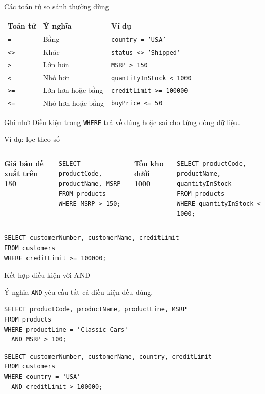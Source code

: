 \documentclass[aspectratio=169,11pt]{beamer}
\newcommand{\kw}[1]{\textcolor{sqlblue}{\texttt{#1}}}
\newcommand{\minihead}[1]{\vspace{2pt}\textbf{#1}\vspace{2pt}}
\begin{document}
\begin{frame}{Các toán tử so sánh thường dùng}
\begin{center}
\begin{tabular}{lll}
\toprule
\textbf{Toán tử} & \textbf{Ý nghĩa} & \textbf{Ví dụ} \\
\midrule
\texttt{=} & Bằng & \texttt{country = 'USA'} \\
\texttt{<>} & Khác & \texttt{status <> 'Shipped'} \\
\texttt{>} & Lớn hơn & \texttt{MSRP > 150} \\
\texttt{<} & Nhỏ hơn & \texttt{quantityInStock < 1000} \\
\texttt{>=} & Lớn hơn hoặc bằng & \texttt{creditLimit >= 100000} \\
\texttt{<=} & Nhỏ hơn hoặc bằng & \texttt{buyPrice <= 50} \\
\bottomrule
\end{tabular}
\end{center}
\begin{exampleblock}{Ghi nhớ}
Điều kiện trong \kw{WHERE} trả về đúng hoặc sai cho từng dòng dữ liệu.
\end{exampleblock}
\end{frame}

\begin{frame}[fragile]{Ví dụ: lọc theo số}
\begin{columns}[T]
\minihead{Giá bán đề xuất trên 150}
\begin{lstlisting}
SELECT productCode, productName, MSRP
FROM products
WHERE MSRP > 150;
\end{lstlisting}
\minihead{Tồn kho dưới 1000}
\begin{lstlisting}
SELECT productCode, productName, quantityInStock
FROM products
WHERE quantityInStock < 1000;
\end{lstlisting}
\end{columns}
\vspace{5pt}
\begin{lstlisting}
SELECT customerNumber, customerName, creditLimit
FROM customers
WHERE creditLimit >= 100000;
\end{lstlisting}
\end{frame}

\begin{frame}[fragile]{Kết hợp điều kiện với AND}
\begin{block}{Ý nghĩa}
\kw{AND} yêu cầu tất cả điều kiện đều đúng.
\end{block}
\begin{lstlisting}
SELECT productCode, productName, productLine, MSRP
FROM products
WHERE productLine = 'Classic Cars'
  AND MSRP > 100;
\end{lstlisting}
\begin{lstlisting}
SELECT customerNumber, customerName, country, creditLimit
FROM customers
WHERE country = 'USA'
  AND creditLimit > 100000;
\end{lstlisting}
\end{frame}
\end{document}
